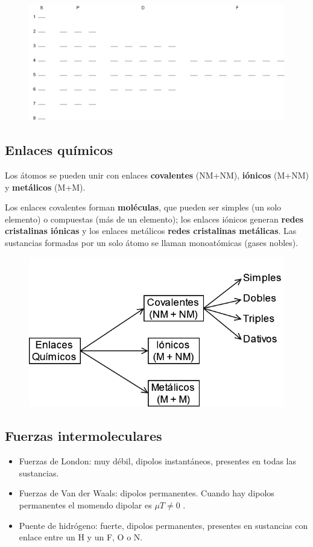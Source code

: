 \begin{figure}[H]
    \centering
    \includegraphics[width=0.8\linewidth]{Images/orbitales.png}
\end{figure}


\subsection*{Enlaces químicos}

Los átomos se pueden unir con enlaces \textbf{covalentes} (NM+NM), \textbf{iónicos} (M+NM) y \textbf{metálicos} (M+M). 

\sskip 
Los enlaces covalentes forman \textbf{moléculas}, que pueden ser simples (un solo elemento) o compuestas (más de un elemento); los enlaces iónicos generan \textbf{redes cristalinas iónicas} y los enlaces metálicos \textbf{redes cristalinas metálicas}. Las sustancias formadas por un solo átomo se llaman monoatómicas (gases nobles).

\begin{figure}[H]
    \centering
    \includegraphics[width=0.7\linewidth]{Images/enlaces_quimicos.png}
\end{figure}


\subsection*{Fuerzas intermoleculares}

\begin{itemize}
    \item Fuerzas de London: muy débil, dipolos instantáneos, presentes en todas las sustancias.

    \item Fuerzas de Van der Waals: dipolos permanentes. Cuando hay dipolos permanentes el momendo dipolar es $\mu T\neq 0$ .

    \item Puente de hidrógeno: fuerte, dipolos permanentes, presentes en sustancias con enlace entre un H y un F, O o N.
\end{itemize}


